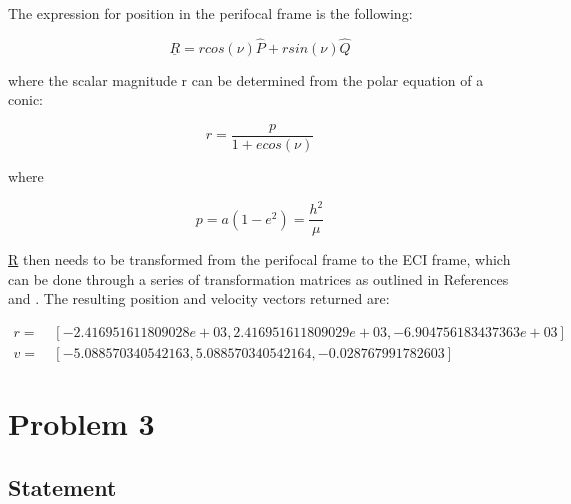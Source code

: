 \documentclass[conf]{new-aiaa}
\begin{document}
The expression for position in the perifocal frame is the following: 

\begin{equation}
\underline{R} = r cos (\nu) \hat{P} + r sin (\nu) \hat{Q}
\end{equation}

where the scalar magnitude r can be determined from the polar equation of a conic: 

\begin{equation}
r = \dfrac{p}{1 + e cos(\nu)}
\end{equation}

where 

\begin{equation}
p = a ( 1 - e^2 ) = \dfrac{h^2}{\mu} 
\end{equation}

\underline{R} then needs to be transformed from the perifocal frame to the ECI frame, which can be done through a series of transformation matrices as outlined in References \cite{bate_astrodynamics} and \cite{jah_mod2}. The resulting position and velocity vectors returned are: 

\begin{equation}
\begin{aligned}
r = &~ [ -2.416951611809028e+03, 2.416951611809029e+03, -6.904756183437363e+03 ] \\
v = &~ [ -5.088570340542163, 5.088570340542164, -0.028767991782603 ]
\end{aligned}
\end{equation}



\section{Problem 3} 

\subsection{Statement} 
\begin{center}
	 \\
\end{center}
\end{document}
